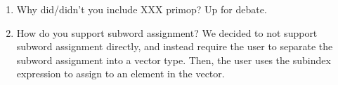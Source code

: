 \documentclass[12pt]{article}
\begin{document}
\begin{enumerate}[topsep=3pt,itemsep=-0.5ex,partopsep=1ex,parsep=1ex]
\item Why did/didn't you include XXX primop?
Up for debate.

\item How do you support subword assignment?
We decided to not support subword assignment directly, and instead require the user to separate the subword assignment into a vector type. Then, the user uses the subindex expression to assign to an element in the vector.

\end{enumerate}
\end{document}
